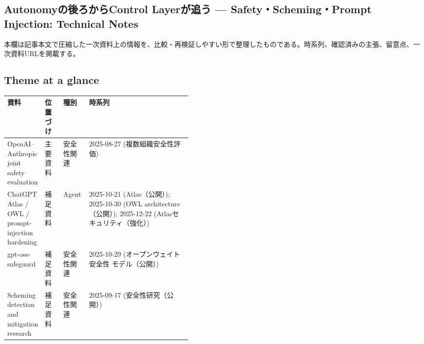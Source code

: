 \subsection*{Autonomyの後ろからControl Layerが追う — Safety・Scheming・Prompt Injection: Technical Notes}
本欄は記事本文で圧縮した一次資料上の情報を、比較・再検証しやすい形で整理したものである。時系列、確認済みの主張、留意点、一次資料URLを掲載する。
\medskip
\subsection*{Theme at a glance}
\begin{center}
\footnotesize
\begin{tabularx}{\linewidth}{@{}p{0.20\linewidth}p{0.10\linewidth}p{0.14\linewidth}X@{}}
\toprule
資料 & 位置づけ & 種別 & 時系列 \\
\midrule
OpenAI–Anthropic joint safety evaluation & 主要資料 & 安全性関連 & 2025-08-27 (複数組織安全性評価)      \\
ChatGPT Atlas / OWL / prompt-injection hardening & 補足資料 & Agent & 2025-10-21 (Atlas（公開）); 2025-10-30 (OWL architecture（公開）); 2025-12-22 (Atlasセキュリティ（強化）)      \\
gpt-oss-safeguard & 補足資料 & 安全性関連 & 2025-10-29 (オープンウェイト 安全性 モデル（公開）)      \\
Scheming detection and mitigation research & 補足資料 & 安全性関連 & 2025-09-17 (安全性研究（公開）)      \\
\bottomrule
\end{tabularx}
\end{center}
\normalsize

